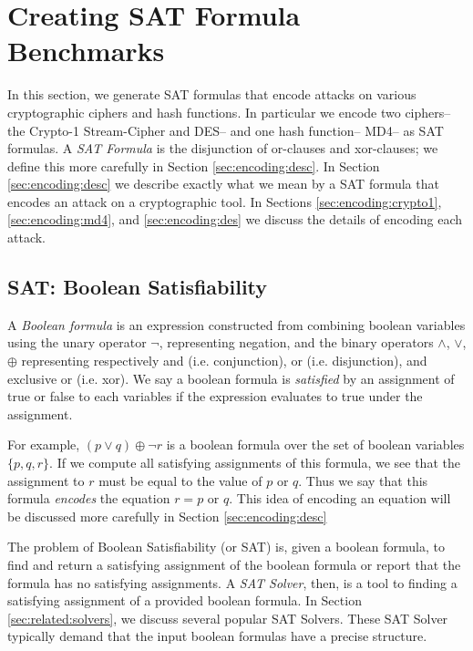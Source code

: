 \section{Creating SAT Formula Benchmarks}
\label{sec:encoding}

In this section, we generate SAT formulas that encode attacks on various cryptographic ciphers and hash functions. In particular we encode two ciphers-- the Crypto-1 Stream-Cipher and DES-- and one hash function-- MD4-- as SAT formulas. A \emph{SAT Formula} is the disjunction of or-clauses and xor-clauses; we define this more carefully in Section \ref{sec:encoding:desc}. In Section \ref{sec:encoding:desc} we describe exactly what we mean by a SAT formula that encodes an attack on a cryptographic tool. In Sections \ref{sec:encoding:crypto1}, \ref{sec:encoding:md4}, and \ref{sec:encoding:des} we discuss the details of encoding each attack.

\subsection{SAT: Boolean Satisfiability}
\label{sec:encoding:sat}

A \emph{Boolean formula} is an expression constructed from combining boolean variables using the unary operator $\neg$, representing negation, and the binary operators $\land$, $\lor$, $\oplus$ representing respectively and (i.e. conjunction), or (i.e. disjunction), and exclusive or (i.e. xor). We say a boolean formula is \emph{satisfied} by an assignment of true or false to each variables if the expression evaluates to true under the assignment.

For example, $(p \lor q) \oplus \neg r$ is a boolean formula over the set of boolean variables $\{p, q, r\}$. If we compute all satisfying assignments of this formula, we see that the assignment to $r$ must be equal to the value of $p \text{ or } q$. Thus we say that this formula \emph{encodes} the equation $r = p \text{ or } q$. This idea of encoding an equation will be discussed more carefully in Section \ref{sec:encoding:desc}

The problem of Boolean Satisfiability (or SAT) is, given a boolean formula, to find and return a satisfying assignment of the boolean formula or report that the formula has no satisfying assignments. A \emph{SAT Solver}, then, is a tool to finding a satisfying assignment of a provided boolean formula. In Section \ref{sec:related:solvers}, we discuss several popular SAT Solvers. These SAT Solver typically demand that the input boolean formulas have a precise structure. 

